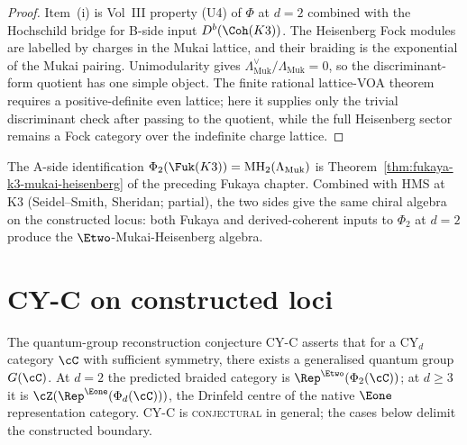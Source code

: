 \begin{proof}
Item~(i) is Vol~III property (U4) of $\Phi$ at $d = 2$
combined with the Hochschild bridge for B-side input
$D^b(\Coh(K3))$. The Heisenberg Fock modules are labelled by charges
in the Mukai lattice, and their braiding is the exponential of the
Mukai pairing. Unimodularity gives
$\Lambda_{\mathrm{Muk}}^{\vee}/\Lambda_{\mathrm{Muk}}=0$, so the discriminant-form quotient
has one simple object. The finite rational lattice-VOA theorem requires
a positive-definite even lattice; here it supplies only the trivial
discriminant check after passing to the quotient, while the full
Heisenberg sector remains a Fock category over the indefinite charge
lattice.
\end{proof}

\begin{remark}
\label{rem:mukai-heisenberg-a-side}
The A-side identification
$\Phi_2(\Fuk(K3)) = \mathrm{MH}_2(\Lambda_{\mathrm{Muk}})$
is Theorem~\ref{thm:fukaya-k3-mukai-heisenberg} of the
preceding Fukaya chapter. Combined with HMS at K3 (Seidel--Smith,
Sheridan; partial), the two sides give the same chiral algebra on the
constructed locus: both Fukaya and derived-coherent inputs to $\Phi_2$
at $d = 2$ produce the $\Etwo$-Mukai-Heisenberg algebra.
\end{remark}


\section{CY-C on constructed loci}
\label{sec:cy-c-constructed-loci}

The quantum-group reconstruction conjecture CY-C asserts that for
a CY$_d$ category $\cC$ with sufficient symmetry, there exists a
generalised quantum group $G(\cC)$. At $d = 2$ the predicted braided
category is $\Rep^{\Etwo}(\Phi_2(\cC))$; at $d \geq 3$ it is
$\cZ(\Rep^{\Eone}(\Phi_d(\cC)))$, the Drinfeld centre of the native
$\Eone$ representation category. CY-C is \textsc{conjectural} in
general; the cases below delimit the constructed boundary.

